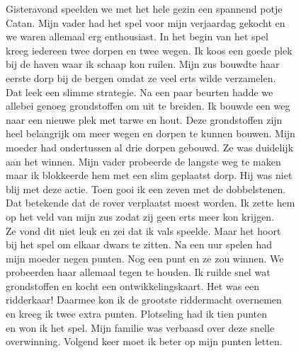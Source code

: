 \begin{opgave}

\begin{tekstmetfouten}
Gisteravond speelden we met het hele gezin een spannend potje\\
Catan. Mijn vader had het spel voor mijn verjaardag gekocht en\\
we waren allemaal erg enthousiast. In het begin van het spel\\
kreeg iedereen twee dorpen en twee wegen. Ik koos een goede plek\\
bij de haven waar ik schaap kon ruilen. Mijn zus bouwdte haar\\
eerste dorp bij de bergen omdat ze veel erts wilde verzamelen.\\
Dat leek een slimme strategie. Na een paar beurten hadde we\\
allebei genoeg grondstoffen om uit te breiden. Ik bouwde een weg\\
naar een nieuwe plek met tarwe en hout. Deze grondstoffen zijn\\
heel belangrijk om meer wegen en dorpen te kunnen bouwen. Mijn\\
moeder had ondertussen al drie dorpen gebouwd. Ze was duidelijk\\
aan het winnen. Mijn vader probeerde de langste weg te maken\\
maar ik blokkeerde hem met een slim geplaatst dorp. Hij was niet\\
blij met deze actie. Toen gooi ik een zeven met de dobbelstenen.\\
Dat betekende dat de rover verplaatst moest worden. Ik zette hem\\
op het veld van mijn zus zodat zij geen erts meer kon krijgen.\\
Ze vond dit niet leuk en zei dat ik vals speelde. Maar het hoort\\
bij het spel om elkaar dwars te zitten. Na een uur spelen had\\
mijn moeder negen punten. Nog een punt en ze zou winnen. We\\
probeerden haar allemaal tegen te houden. Ik ruilde snel wat\\
grondstoffen en kocht een ontwikkelingskaart. Het was een\\
ridderkaar! Daarmee kon ik de grootste riddermacht overnemen\\
en kreeg ik twee extra punten. Plotseling had ik tien punten\\
en won ik het spel. Mijn familie was verbaasd over deze snelle\\
overwinning. Volgend keer moet ik beter op mijn punten letten.
\end{tekstmetfouten}


\end{opgave}
